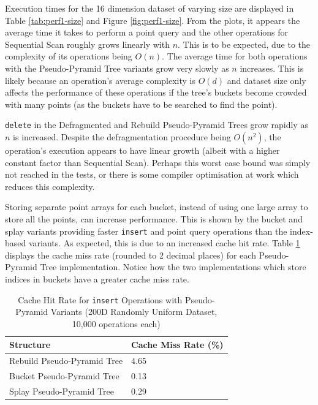 Execution times for the 16 dimension dataset of varying size are displayed in Table \ref{tab:perf1-size} and Figure \ref{fig:perf1-size}. From the plots, it appears the average time it takes to perform a point query and the other operations for Sequential Scan roughly grows linearly with $n$. This is to be expected, due to the complexity of its operations being $O(n)$. The average time for both operations with the Pseudo-Pyramid Tree variants grow very slowly as $n$ increases. This is likely because an operation's average complexity is $O(d)$ and dataset size only affects the performance of these operations if the tree's buckets become crowded with many points (as the buckets have to be searched to find the point).

\texttt{delete} in the Defragmented and Rebuild Pseudo-Pyramid Trees grow rapidly as $n$ is increased. Despite the defragmentation procedure being $O(n^2)$, the operation's execution appears to have linear growth (albeit with a higher constant factor than Sequential Scan). Perhaps this worst case bound was simply not reached in the tests, or there is some compiler optimisation at work which reduces this complexity.

Storing separate point arrays for each bucket, instead of using one large array to store all the points, can increase performance. This is shown by the bucket and splay variants providing faster \texttt{insert} and point query operations than the index-based variants. As expected, this is due to an increased cache hit rate. Table \ref{tab:perf1-cache-hit-rate} displays the cache miss rate (rounded to 2 decimal places) for each Pseudo-Pyramid Tree implementation. Notice how the two implementations which store indices in buckets have a greater cache miss rate. 

\begin{table}
	\centering
	\begin{tabular}{|l|l|}
		\hline
		\textbf{Structure} & \textbf{Cache Miss Rate (\%)} \\
		\hline
		Rebuild Pseudo-Pyramid Tree & 4.65 \\
		Bucket Pseudo-Pyramid Tree & 0.13 \\
		Splay Pseudo-Pyramid Tree & 0.29 \\
		\hline
	\end{tabular}
	\caption{Cache Hit Rate for \texttt{insert} Operations with Pseudo-Pyramid Variants (200D Randomly Uniform Dataset, 10,000 operations each)}
	\label{tab:perf1-cache-hit-rate}
\end{table}

